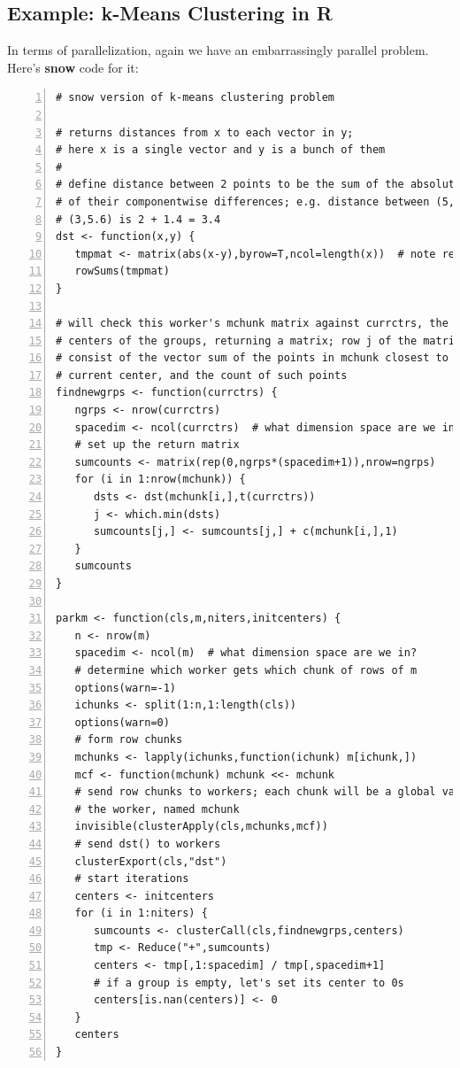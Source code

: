 \subsection{Example:  k-Means Clustering in R}

In terms of parallelization, again we have an embarrassingly parallel
problem.  Here's {\bf snow} code for it:

\begin{lstlisting}[numbers=left]
# snow version of k-means clustering problem

# returns distances from x to each vector in y;
# here x is a single vector and y is a bunch of them
#
# define distance between 2 points to be the sum of the absolute values
# of their componentwise differences; e.g. distance between (5,4.2) and
# (3,5.6) is 2 + 1.4 = 3.4
dst <- function(x,y) {
   tmpmat <- matrix(abs(x-y),byrow=T,ncol=length(x))  # note recycling
   rowSums(tmpmat)
}

# will check this worker's mchunk matrix against currctrs, the current
# centers of the groups, returning a matrix; row j of the matrix will
# consist of the vector sum of the points in mchunk closest to j-th
# current center, and the count of such points
findnewgrps <- function(currctrs) {
   ngrps <- nrow(currctrs)
   spacedim <- ncol(currctrs)  # what dimension space are we in?
   # set up the return matrix
   sumcounts <- matrix(rep(0,ngrps*(spacedim+1)),nrow=ngrps)
   for (i in 1:nrow(mchunk)) {
      dsts <- dst(mchunk[i,],t(currctrs))
      j <- which.min(dsts)
      sumcounts[j,] <- sumcounts[j,] + c(mchunk[i,],1)
   }
   sumcounts
}

parkm <- function(cls,m,niters,initcenters) {
   n <- nrow(m)
   spacedim <- ncol(m)  # what dimension space are we in?
   # determine which worker gets which chunk of rows of m
   options(warn=-1)
   ichunks <- split(1:n,1:length(cls))
   options(warn=0)
   # form row chunks
   mchunks <- lapply(ichunks,function(ichunk) m[ichunk,])
   mcf <- function(mchunk) mchunk <<- mchunk
   # send row chunks to workers; each chunk will be a global variable at
   # the worker, named mchunk
   invisible(clusterApply(cls,mchunks,mcf))
   # send dst() to workers
   clusterExport(cls,"dst")
   # start iterations
   centers <- initcenters
   for (i in 1:niters) {
      sumcounts <- clusterCall(cls,findnewgrps,centers)
      tmp <- Reduce("+",sumcounts)
      centers <- tmp[,1:spacedim] / tmp[,spacedim+1]
      # if a group is empty, let's set its center to 0s
      centers[is.nan(centers)] <- 0
   }
   centers
}
\end{lstlisting}



